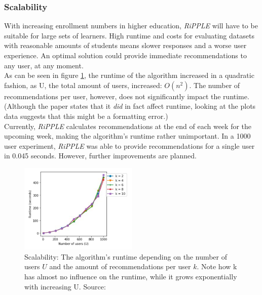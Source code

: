 \documentclass[conference]{IEEEtran}
\begin{document}
\subsubsection{Scalability} \label{paper:scalability}
With increasing enrollment numbers in higher education, \textit{RiPPLE} will have to be suitable for large sets of learners. High runtime and costs for evaluating datasets with reasonable amounts of students means slower responses and a worse user experience. An optimal solution could provide immediate recommendations to any user, at any moment.\\
As can be seen in figure \ref{f:scalability}, the runtime of the algorithm increased in a quadratic fashion, as U, the total amount of users, increased: \(O(n^2)\). The number of recommendations per user, however, does not significantly impact the runtime. (Although the paper states that it \textit{did} in fact affect runtime, looking at the plots data suggests that this might be a formatting error.)\\
Currently, \textit{RiPPLE} calculates recommendations at the end of each week for the upcoming week, making the algorithm's runtime rather unimportant. In a 1000 user experiment, \textit{RiPPLE} was able to provide recommendations for a single user in 0.045 seconds. However, further improvements are planned.\\
\begin{figure}[!t]
	\centering
	\includegraphics[width=0.5\textwidth]{g/Runtime.PNG}
	\caption{Scalability: The algorithm's runtime depending on the number of users \(U\) and the amount of recommendations per user \(k\). Note how k has almost no influence on the runtime, while it grows exponentially with increasing U. Source: \cite{potts2018reciprocal}}
	\label{f:scalability}
\end{figure}
\end{document}
